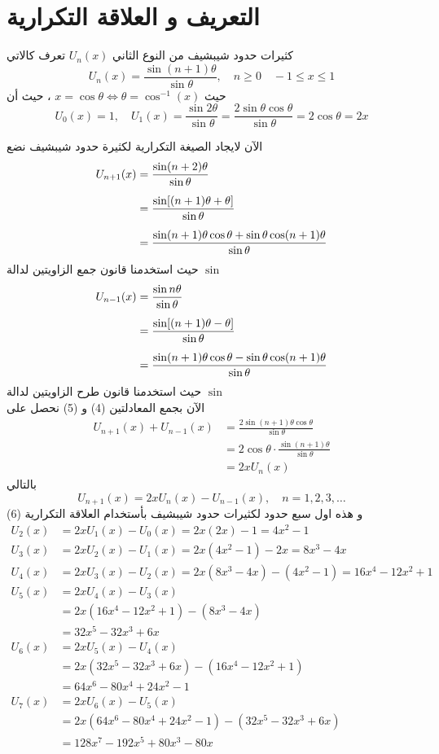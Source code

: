 \section{التعريف و العلاقة التكرارية}
\begin{definition}
	كثيرات حدود شيبشيف من النوع الثاني $U_n(x)$ تعرف كالاتي
	\[
	U_n(x) = \frac{\sin(n+1)\theta}{\sin\theta},\quad n\geq 0 \quad -1 \leq x \leq 1
	\]
	حيث $x=\cos\theta \iff \theta = \cos^{-1}(x)$ ، حيث أن 
\[
U_0(x) = 1, \quad U_1(x) = \frac{\sin2\theta}{\sin\theta} = \frac{2\sin \theta\cos\theta}{\sin\theta}= 2\cos\theta=2x
\]
\end{definition}
\noindent
الآن لايجاد الصيغة التكرارية لكثيرة حدود شيبشيف نضع
\begin{align}
U_{n+1} (x) &= \frac{\sin(n+2)\theta}{\sin\theta}\notag\\[5pt]
&= \frac{\sin[(n+1)\theta + \theta]}{\sin \theta}\notag\\[5pt]
&= \frac{\sin(n+1)\theta\cos\theta + \sin\theta\cos(n+1)\theta}{\sin\theta}
\end{align}
حيث استخدمنا قانون جمع الزاويتين لدالة $\sin$
\begin{align}
	U_{n-1} (x) &= \frac{\sin n\theta}{\sin\theta}\notag\\[5pt]
&= \frac{\sin[(n+1)\theta -\theta]}{\sin \theta}\notag\\[5pt]
 &= \frac{\sin(n+1)\theta\cos\theta - \sin\theta\cos(n+1)\theta}{\sin\theta}
\end{align}
حيث استخدمنا قانون طرح الزاويتين لدالة $\sin$\\
الآن  بجمع المعادلتين (4) و (5) نحصل على
\begin{align*}
	U_{n+1}(x) + U_{n-1}(x) &= \frac{2\sin(n+1)\theta\cos\theta}{\sin\theta}\\
   &= 2\cos\theta \cdot \frac{\sin(n+1)\theta}{\sin \theta}\\
   &= 2x U_n(x)
\end{align*}
بالتالي
\begin{equation}
	\boxed{U_{n+1}(x) = 2x U_n(x) - U_{n-1}(x), \quad n = 1,2,3,\dots}
\end{equation}
و هذه اول سبع حدود لكثيرات حدود شيبشيف بأستخدام العلاقة التكرارية (6)
\begin{align*}
	U_2(x) &= 2x U_1(x) - U_0(x) = 2x(2x) - 1 = 4x^2 - 1\\
	U_3(x) &= 2x U_2(x) - U_1(x) = 2x(4x^2 - 1) - 2x =8x^3 - 4x\\
	U_4(x) &= 2x U_3(x) - U_2(x) = 2x(8x^3 - 4x) - (4x^2 - 1) = 16x^4 - 12x^2 + 1\\
		U_5(x) &= 2xU_4(x) - U_3(x) \\ 
		&= 2x(16x^4 - 12x^2 + 1) - (8x^3 - 4x)\\
		&= 32 x^5 - 32x^3 + 6x\\
		U_6(x) &= 2x U_5(x) - U_4(x) \\
		&= 2x(32 x^5 - 32x^3 + 6x) - (16x^4 - 12x^2 + 1)\\
		&= 64 x^6 - 80x^4 + 24x^2 - 1\\
		U_7(x) &= 2x U_6(x) - U_5(x) \\
		&= 2x(64 x^6 - 80x^4 + 24x^2 - 1) - (32 x^5 - 32x^3 + 6x)\\
		&= 128 x^7 - 192x^5 + 80 x^3 - 80 x
\end{align*}
